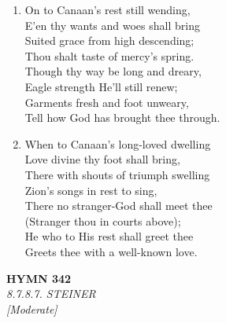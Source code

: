 \documentclass[11pt,a4paper]{article}
\begin{document}
\begin{enumerate}
    \item On to Canaan's rest still wending, \\
        E'en thy wants and woes shall bring \\
        Suited grace from high descending; \\
        Thou shalt taste of mercy's spring. \\
        Though thy way be long and dreary, \\
        Eagle strength He'll still renew; \\
        Garments fresh and foot unweary, \\
        Tell how God has brought thee through.

    \item When to Canaan's long-loved dwelling \\
        Love divine thy foot shall bring, \\
        There with shouts of triumph swelling \\
        Zion's songs in rest to sing, \\
        There no stranger-God shall meet thee \\
        (Stranger thou in courts above); \\
        He who to His rest shall greet thee \\
        Greets thee with a well-known love.

\end{enumerate}

\newpage
\begin{center}
    {\Large \textbf{HYMN 342}}
    \\
    \textit{8.7.8.7. STEINER}
    \\
    \textit{\small [Moderate]}
\end{center}
\vspace{1em}
\end{document}
